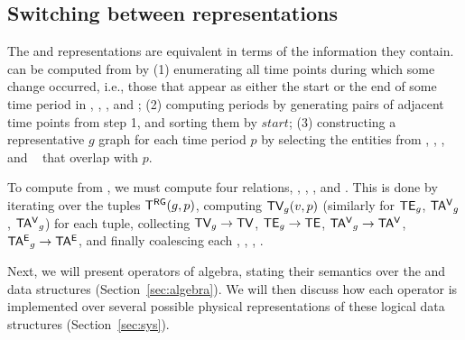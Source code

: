 


\subsection{Switching between representations}  
\label{sec:model:switch}

The \trg and \tve representations are equivalent in terms of the
information they contain.  \trg can be computed from \tve by (1)
enumerating all time points during which some change occurred, i.e.,
those that appear as either the start or the end of some time period
in \tv, \te, \tav, and \tae; (2) computing \rgs periods by generating
pairs of adjacent time points from step 1, and sorting them by
$start$; (3) constructing a representative $g$ graph for each time
period $p$ by selecting the entities from \tv, \te, \tav, and \tae~
that overlap with $p$.

To compute \ve from \rgs, we must compute four relations, \tv, \te,
\tav, and \tae.  This is done by iterating over the tuples $\mathsf{T^{RG}}
(g,p)$, computing $\textsf{TV}_g(v,p)$ (similarly for $\textsf{TE}_g$, $\mathsf{TA^{V}}_g$,
$\mathsf{TA^{V}}_g$) for each tuple, collecting $\textsf{TV}_g \rightarrow \textsf{TV}$, $\textsf{TE}_g
\rightarrow \textsf{TE}$, $\mathsf{TA^{V}}_g \rightarrow \mathsf{TA^{V}}$, $\mathsf{TA^{E}}_g \rightarrow
\mathsf{TA^{E}}$, and finally coalescing each \tv, \te, \tav, \tae.

Next, we will present operators of \tg algebra, stating their
semantics over the \rgs and \ve data structures
(Section~\ref{sec:algebra}).  We will then discuss how each operator
is implemented over several possible physical representations of these
logical data structures (Section~\ref{sec:sys}).

